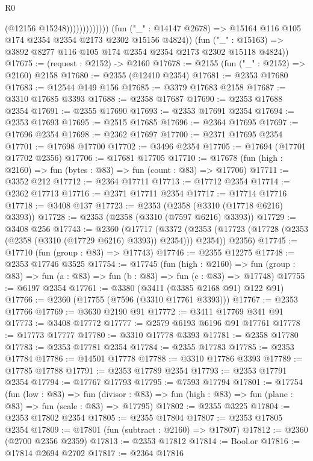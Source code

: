 \begin{lexlean}{R0}
\begin{coremodule}
                                (@12156 @15248)))))))))))))
        (fun ("_" : @14147 @2678) => @15164 @116 @105 @174 @2354 @2354 @2173 @2302 @15156 @4824))
      (fun ("_" : @15163) => @3892 @8277 @116 @105 @174 @2354 @2354 @2173 @2302 @15118 @4824))
@17675 := (request : @2152) -> @2160
@17678 := @2155 (fun ("_" : @2152) => @2160) @2158
@17680 := @2355 (@12410 @2354)
@17681 := @2353 @17680
@17683 := @12544 @149 @156
@17685 := @3379 @17683 @2158
@17687 := @3310 @17685 @3393
@17688 := @2358 @17687
@17690 := @2353 @17688 @2354
@17691 := @2355 @17690
@17693 := @2353 @17691 @2354
@17694 := @2353 @17693
@17695 := @2515 @17685
@17696 := @2364 @17695
@17697 := @17696 @2354
@17698 := @2362 @17697
@17700 := @2371 @17695 @2354
@17701 := @17698 @17700
@17702 := @3496 @2354
@17705 := @17694 (@17701 @17702 @2356)
@17706 := @17681 @17705
@17710 := @17678 (fun (high : @2160) => fun (bytes : @83) => fun (count : @83) => @17706)
@17711 := @3352 @212
@17712 := @2364 @17711
@17713 := @17712 @2354
@17714 := @2362 @17713
@17716 := @2371 @17711 @2354
@17717 := @17714 @17716
@17718 := @3408 @137
@17723 := @2353 (@2358 (@3310 (@17718 @6216) @3393))
@17728 := @2353 (@2358 (@3310 (@7597 @6216) @3393))
@17729 := @3408 @256
@17743 := @2360
    (@17717
      (@3372 (@2353 (@17723 (@17728 (@2353 (@2358 (@3310 (@17729 @6216) @3393)) @2354))) @2354))
      @2356)
@17745 := @17710 (fun (group : @83) => @17743)
@17746 := @2355 @12275
@17748 := @2353 @17746 @3525
@17754 := @17745
    (fun (high : @2160) =>
    fun (group : @83) => fun (a : @83) => fun (b : @83) => fun (c : @83) => @17748)
@17755 := @6197 @2354
@17761 := @3380 (@3411 (@3385 @2168 @91) @122 @91)
@17766 := @2360 (@17755 (@7596 (@3310 @17761 @3393)))
@17767 := @2353 @17766
@17769 := @3630 @2190 @91
@17772 := @3411 @17769 @341 @91
@17773 := @3408 @17772
@17777 := @2579 @6193 @6196 @91 @17761
@17778 := @17773 @17777
@17780 := @3310 @17778 @3393
@17781 := @2358 @17780
@17783 := @2353 @17781 @2354
@17784 := @2355 @17783
@17785 := @2353 @17784
@17786 := @14501 @17778
@17788 := @3310 @17786 @3393
@17789 := @17785 @17788
@17791 := @2353 @17789 @2354
@17793 := @2353 @17791 @2354
@17794 := @17767 @17793
@17795 := @7593 @17794
@17801 := @17754
    (fun (low : @83) =>
    fun (divisor : @83) => fun (high : @83) => fun (plane : @83) => fun (scale : @83) => @17795)
@17802 := @2355 @3225
@17804 := @2353 @17802 @2354
@17805 := @2355 @17804
@17807 := @2353 @17805 @2354
@17809 := @17801 (fun (subtract : @2160) => @17807)
@17812 := @2360 (@2700 @2356 @2359)
@17813 := @2353 @17812
@17814 := Bool.or
@17816 := @17814 @2694 @2702
@17817 := @2364 @17816

\end{coremodule}
\end{lexlean}
